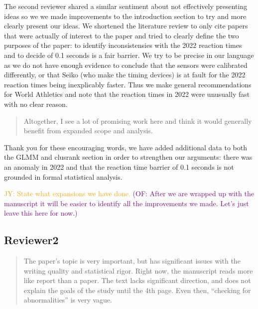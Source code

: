 \documentclass[12pt]{article}
\newcommand{\jy}[1]{\textcolor{orange}{JY: #1}}
\newcommand{\of}[1]{\textcolor{purple}{(OF: #1)}}
\newenvironment{comment}%
{\begin{quotation}\noindent\small\it\color{darkblue}\ignorespaces%
}{\end{quotation}}
\begin{document}
The second reviewer shared a similar sentiment about not effectively
presenting ideas so we we made improvements to the introduction section to try
and more clearly present our ideas.  We shortened the literature review to only
cite papers that were actually of interest to the paper and tried to clearly
define the two purposes of the paper: to identify inconsistensies with the 2022
reaction times and to decide of 0.1 seconds is a fair barrier. We try to be precise in
our language as we do not have enough evidence to conclude that the sensors were
calibrated differently, or that Seiko (who make the timing devices) is at fault
for the 2022 reaction times being inexplicably faster. Thus we make general
recommendations for World Athletics and note that the reaction times in 2022
were unusually fast with no clear reason.

\begin{comment}
Altogether, I see a lot of promising work here and think it would generally
benefit from expanded scope and analysis.
\end{comment}


Thank you for these encouraging words, we have added additional data to both
the GLMM and clusrank section in order to strengthen our arguments: there was
an anomaly in 2022 and that the reaction time barrier of 0.1 seconds is not
grounded in formal statistical analysis.

\jy{State what expansions we
  have done.}
\of{After we are wrapped up with the manuscript it will be easier to identify
all the improvements we made. Let's just leave this here for now.}  

\subsection*{Reviewer2}


\begin{comment}
The paper’s topic is very important, but has significant issues with the writing
quality and statistical rigor. Right now, the manuscript reads more like report
than a paper. The text lacks significant direction, and does not explain the
goals of the study until the 4th page. Even then, “checking for abnormalities”
is very vague.
\end{comment}
\end{document}
